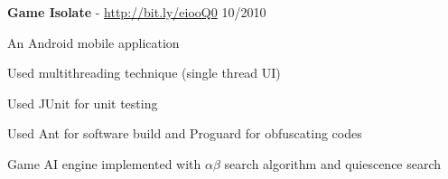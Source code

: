 \documentclass[margin,line]{resume}
\begin{document}
\begin{resume}
    \textbf{Game Isolate} - \url{http://bit.ly/eiooQ0} \hfill 10/2010 \vspace{-3mm}\\\vspace{-1mm}%
      \begin{list2}
       \item An Android mobile application
       \item Used multithreading technique (single thread UI)
       \item Used JUnit for unit testing
       \item Used Ant for software build and Proguard for obfuscating codes
       \item Game AI engine implemented with $\alpha \beta$ search algorithm and quiescence search
      \end{list2}
\end{resume}
\end{document}

